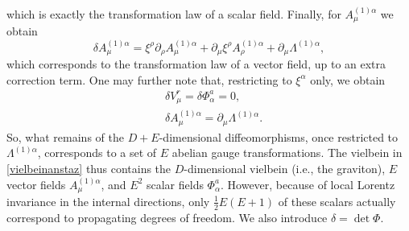 \documentclass{article}
\begin{document}
which is exactly the transformation law of a scalar field. Finally, for $A^{(1)\alpha}_\mu$ we obtain
\begin{equation*}
    \delta A^{(1)\alpha}_\mu= \xi^{\rho}\partial_\rho A^{(1)\alpha}_\mu + \partial_\mu \xi^{\rho} A^{(1)\alpha}_\rho +\partial_\mu \Lambda^{(1)\alpha},
\end{equation*}
which corresponds to the transformation law of a vector field, up to an extra correction term. One may further note that, restricting to $\xi^\alpha$ only, we obtain
\begin{subequations}
\begin{align}
&\delta V^r_\mu = \delta \Phi^a_\alpha = 0,\\
&\delta A^{(1)\alpha}_\mu = \partial_\mu \Lambda^{(1)\alpha} .
\end{align}
\end{subequations}
So, what remains of the $D+E$-dimensional diffeomorphisms, once restricted to $\Lambda^{(1)\alpha}$, corresponds to a set of $E$ abelian gauge transformations.
The vielbein in \eqref{vielbeinanstaz} thus contains the $D$-dimensional vielbein (i.e., the graviton), $E$ vector fields $A^{(1)\alpha}_\mu$, and $E^2$ scalar fields $\Phi^a_\alpha$. However, because of local Lorentz invariance in the internal directions, only $\frac{1}{2}E(E+1)$ of these scalars actually correspond to propagating degrees of freedom. We also introduce $\delta = \det \Phi$. 
\end{document}
